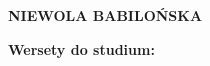 \documentclass[10pt,a4paper,oneside]{article}
\begin{document}
\centerline{\textbf{\MakeUppercase{Niewola Babilońska}}}
\begin{center}
\textbf{Wersety do studium:} 

\end{center}
\end{document}

